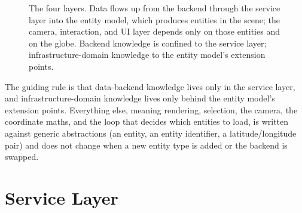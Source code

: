 \begin{figure}[t]
  \centering
  \caption[Viewer architecture: four layers]{The four layers. Data flows up from the backend through the service layer into the entity model, which produces entities in the scene; the camera, interaction, and UI layer depends only on those entities and on the globe. Backend knowledge is confined to the service layer; infrastructure-domain knowledge to the entity model's extension points.}
  \label{fig:arch-overview}
\end{figure}

The guiding rule is that data-backend knowledge lives only in the service layer, and infrastructure-domain knowledge lives only behind the entity model's extension points. Everything else, meaning rendering, selection, the camera, the coordinate maths, and the loop that decides which entities to load, is written against generic abstractions (an entity, an entity identifier, a latitude/longitude pair) and does not change when a new entity type is added or the backend is swapped.

\section{Service Layer}
\label{sec:service-layer}

